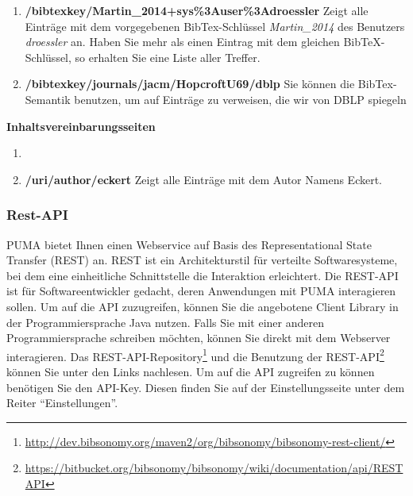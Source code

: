 \documentclass[b5paper,11pt,twoside]{scrbook} %
\begin{document}
\begin{enumerate}
    \item \textbf{/bibtexkey/Martin\_2014+sys\%3Auser\%3Adroessler} \newline
    Zeigt alle Einträge mit dem vorgegebenen BibTex-Schlüssel \textit{Martin\_2014} des Benutzers \textit{droessler} an. Haben Sie mehr als einen Eintrag mit dem gleichen BibTeX-Schlüssel, so erhalten Sie eine Liste aller Treffer.
    \item \textbf{/bibtexkey/journals/jacm/HopcroftU69/dblp} \newline
    Sie können die BibTex-Semantik benutzen, um auf Einträge zu verweisen, die wir von DBLP spiegeln  %
\end{enumerate}

\textbf{Inhaltsvereinbarungsseiten}
\begin{enumerate}
    \item 
    \item \textbf{/uri/author/eckert} \newline
    Zeigt alle Einträge mit dem Autor Namens Eckert.
\end{enumerate}

\subsubsection{Rest-API}
PUMA bietet Ihnen einen Webservice auf Basis des Representational State Transfer (REST) an. REST ist ein Architekturstil für verteilte Softwaresysteme, bei dem eine einheitliche Schnittstelle die Interaktion erleichtert. \newline
Die REST-API ist für Softwareentwickler gedacht, deren Anwendungen mit PUMA interagieren sollen. Um auf die API zuzugreifen, können Sie die angebotene Client Library in der Programmiersprache Java nutzen. Falls Sie mit einer anderen Programmiersprache schreiben möchten, können Sie direkt mit dem Webserver interagieren.\newline
Das REST-API-Repository\footnote{\url{http://dev.bibsonomy.org/maven2/org/bibsonomy/bibsonomy-rest-client/}} und die Benutzung der REST-API\footnote{\url{https://bitbucket.org/bibsonomy/bibsonomy/wiki/documentation/api/REST API}} können Sie unter den Links nachlesen.
\newline
\newline
Um auf die API zugreifen zu können benötigen Sie den API-Key. Diesen finden Sie auf der Einstellungsseite unter dem Reiter \enquote{Einstellungen}. 
\end{document}
